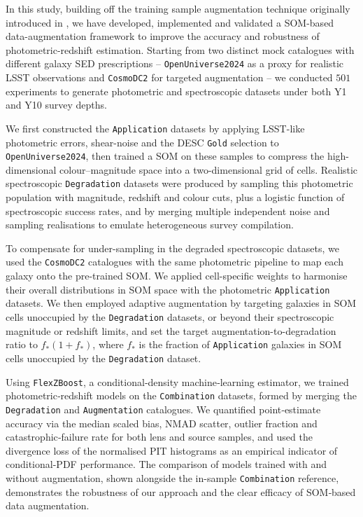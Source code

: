 In this study, building off the training sample augmentation technique originally introduced in \citep{2024ApJ...967L...6M}, we have developed, implemented and validated a SOM-based data-augmentation framework to improve the accuracy and robustness of photometric-redshift estimation. Starting from two distinct mock catalogues with different galaxy SED prescriptions -- \texttt{OpenUniverse2024} as a proxy for realistic LSST observations and \texttt{CosmoDC2} for targeted augmentation -- we conducted \(501\) experiments to generate photometric and spectroscopic datasets under both Y1 and Y10 survey depths.

We first constructed the \texttt{Application} datasets by applying LSST-like photometric errors, shear-noise and the DESC \texttt{Gold} selection to \texttt{OpenUniverse2024}, then trained a SOM on these samples to compress the high-dimensional colour–magnitude space into a two-dimensional grid of cells. Realistic spectroscopic \texttt{Degradation} datasets were produced by sampling this photometric population with magnitude, redshift and colour cuts, plus a logistic function of spectroscopic success rates, and by merging multiple independent noise and sampling realisations to emulate heterogeneous survey compilation.

To compensate for under-sampling in the degraded spectroscopic datasets, we used the \texttt{CosmoDC2} catalogues with the same photometric pipeline to map each galaxy onto the pre-trained SOM. We applied cell-specific weights to harmonise their overall distributions in SOM space with the photometric \texttt{Application} datasets. We then employed adaptive augmentation by targeting galaxies in SOM cells unoccupied by the \texttt{Degradation} datasets, or beyond their spectroscopic magnitude or redshift limits, and set the target augmentation-to-degradation ratio to \(f_\ast(1+f_\ast)\), where \(f_\ast\) is the fraction of \texttt{Application} galaxies in SOM cells unoccupied by the \texttt{Degradation} dataset.

Using \texttt{FlexZBoost}, a conditional‐density machine‐learning estimator, we trained photometric‐redshift models on the \texttt{Combination} datasets, formed by merging the \texttt{Degradation} and \texttt{Augmentation} catalogues. We quantified point‐estimate accuracy via the median scaled bias, NMAD scatter, outlier fraction and catastrophic‐failure rate for both lens and source samples, and used the divergence loss of the normalised PIT histograms as an empirical indicator of conditional-PDF performance. The comparison of models trained with and without augmentation, shown alongside the in-sample \texttt{Combination} reference, demonstrates the robustness of our approach and the clear efficacy of SOM‐based data augmentation.

